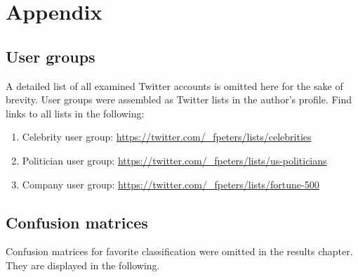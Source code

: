 %
%
%
%
%

\appendix

\section{Appendix}
\label{ch:appendix}

\subsection{User groups}
\label{sec:user_groups}

A detailed list of all examined Twitter accounts is omitted here for the sake
of brevity.
User groups were assembled as Twitter lists in the author's profile.
Find links to all lists in the following:

\begin{enumerate}
\item Celebrity user group: \url{https://twitter.com/_fpeters/lists/celebrities}
\item Politician user group: \url{https://twitter.com/_fpeters/lists/us-politicians}
\item Company user group: \url{https://twitter.com/_fpeters/lists/fortune-500}
\end{enumerate}

\subsection{Confusion matrices}
\label{sec:confusion_matrices}

Confusion matrices for favorite classification were omitted in the results chapter.
They are displayed in the following.

